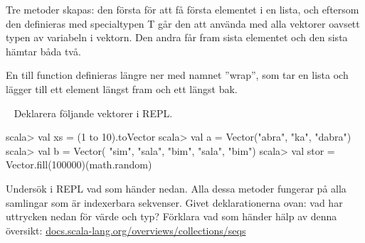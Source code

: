 \SubtaskSolved 
Tre metoder skapas: den första för att få första elementet i en lista, och eftersom den definieras med specialtypen T går den att använda med alla vektorer oavsett typen av variabeln i vektorn. Den andra får fram sista elementet och den sista hämtar båda två.

En till function definieras längre ner med  namnet ''wrap'', som tar en lista och lägger till ett element längst fram och ett längst bak.


\QUESTEND









\QUESTBEGIN

\Task  \what~  Deklarera följande vektorer i REPL.
\begin{REPL}
scala> val xs = (1 to 10).toVector
scala> val a = Vector("abra", "ka", "dabra")
scala> val b = Vector( "sim", "sala", "bim", "sala", "bim")
scala> val stor = Vector.fill(100000)(math.random)
\end{REPL}
Undersök i REPL vad som händer nedan. Alla dessa metoder fungerar på alla samlingar som är indexerbara sekvenser. Givet deklarationerna ovan: vad har uttrycken nedan för värde och typ? Förklara vad som händer hälp av denna  översikt: \href{http://docs.scala-lang.org/overviews/collections/seqs}{docs.scala-lang.org/overviews/collections/seqs}

\Subtask {}

\Subtask {}

\Subtask {}

\Subtask {}

\Subtask {}

\Subtask {}

\Subtask {}

\Subtask {}

\Subtask {}

\Subtask {}

\Subtask {}

\Subtask {}

\Subtask {}

\Subtask {}


